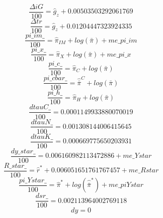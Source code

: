 \begin{dmath}
\frac{{\Delta{iG}}}{100}={{\hat{g}_z}}+0.00503503292061769
\end{dmath}
\begin{dmath}
\frac{{\Delta{tr}}}{100}={{\hat{g}_z}}+0.01204447323924335
\end{dmath}
\begin{dmath}
\frac{{pi\_im\_}}{100}={\hat{\pi}_{IM}}+log\left({\bar{\pi}}\right)+{me\_pi\_im}
\end{dmath}
\begin{dmath}
\frac{{pi\_x\_}}{100}={\hat{\pi}_{X}}+log\left({\bar{\pi}}\right)+{me\_pi\_x}
\end{dmath}
\begin{dmath}
\frac{{pi\_c\_}}{100}={\hat{\pi}_{C}}+log\left({\bar{\pi}}\right)
\end{dmath}
\begin{dmath}
\frac{{pi\_cbar\_}}{100}={\hat{\bar{\pi}}^C}+log\left({\bar{\pi}}\right)
\end{dmath}
\begin{dmath}
\frac{{pi\_h\_}}{100}={\hat{\pi}_{H}}+log\left({\bar{\pi}}\right)
\end{dmath}
\begin{dmath}
\frac{{dtauC\_}}{100}=0.0001149933880070019
\end{dmath}
\begin{dmath}
\frac{{dtauN\_}}{100}=0.001308144006415645
\end{dmath}
\begin{dmath}
\frac{{dtauK\_}}{100}=0.000669775650203931
\end{dmath}
\begin{dmath}
\frac{{dy\_star\_}}{100}=0.006160982113472886+{me\_Ystar}
\end{dmath}
\begin{dmath}
\frac{{R\_star\_}}{100}={\hat{r}^*}+0.006051651761767457+{me\_Rstar}
\end{dmath}
\begin{dmath}
\frac{{pi\_Ystar\_}}{100}={\hat{\pi}^*}+log\left({\hat{\bar{\pi}}^*}\right)+{me\_piYstar}
\end{dmath}
\begin{dmath}
\frac{{dsr\_}}{100}=0.002113964002769118
\end{dmath}
\begin{dmath}
{dy}=0
\end{dmath}
